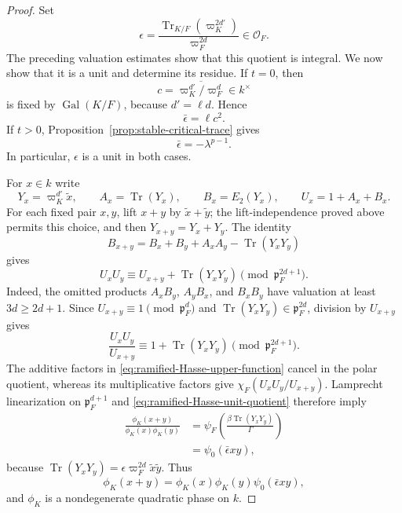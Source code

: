 \documentclass[11pt]{amsart}
\theoremstyle{definition}
\theoremstyle{remark}
\newcommand{\cO}{\mathcal O}
\newcommand{\p}{\mathfrak p}
\newcommand{\Tr}{\operatorname{Tr}}
\newcommand{\Gal}{\operatorname{Gal}}
\begin{document}
\begin{proof}
Set
\begin{equation}\label{eq:ramified-Hasse-epsilon}
 \epsilon=
 \frac{\Tr_{K/F}(\varpi_K^{2d'})}{\varpi_F^{2d}}\in\cO_F.
\end{equation}
The preceding valuation estimates show that this quotient is integral.
We now show that it is a unit and determine its residue.  If $t=0$,
then
\[
 c=\overline{\varpi_K^{d'}/\varpi_F^d}\in k^\times
\]
is fixed by $\Gal(K/F)$, because $d'=\ell d$.  Hence
\begin{equation}\label{eq:ramified-epsilon-tame}
 \bar\epsilon=\ell c^2.
\end{equation}
If $t>0$, Proposition~\ref{prop:stable-critical-trace} gives
\begin{equation}\label{eq:ramified-epsilon-wild}
 \bar\epsilon=-\lambda^{p-1}.
\end{equation}
In particular, $\epsilon$ is a unit in both cases.

For $x\in k$ write
\[
 Y_x=\varpi_K^{d'}\widetilde x,\qquad
 A_x=\Tr(Y_x),\qquad B_x=E_2(Y_x),\qquad
 U_x=1+A_x+B_x.
\]
For each fixed pair $x,y$, lift $x+y$ by
$\widetilde x+\widetilde y$; the lift-independence proved above permits
this choice, and then $Y_{x+y}=Y_x+Y_y$.  The identity
\[
 B_{x+y}=B_x+B_y+A_xA_y-\Tr(Y_xY_y)
\]
gives
\[
 U_xU_y
 \equiv U_{x+y}+\Tr(Y_xY_y)
 \pmod{\p_F^{2d+1}}.
\]
Indeed, the omitted products $A_xB_y$, $A_yB_x$, and $B_xB_y$ have
valuation at least $3d\ge2d+1$.  Since
$U_{x+y}\equiv1\pmod{\p_F^d}$ and
$\Tr(Y_xY_y)\in\p_F^{2d}$, division by $U_{x+y}$ gives
\begin{equation}\label{eq:ramified-Hasse-unit-quotient}
 \frac{U_xU_y}{U_{x+y}}
 \equiv1+\Tr(Y_xY_y)\pmod{\p_F^{2d+1}}.
\end{equation}
The additive factors in
\eqref{eq:ramified-Hasse-upper-function} cancel in the polar quotient,
whereas its multiplicative factors give
$\chi_F(U_xU_y/U_{x+y})$.  Lamprecht linearization on
$\p_F^{d+1}$ and \eqref{eq:ramified-Hasse-unit-quotient} therefore
imply
\begin{align*}
 \frac{\phi_K(x+y)}{\phi_K(x)\phi_K(y)}
 &=\psi_F\!\left(
    \frac{\beta\Tr(Y_xY_y)}{\Gamma}\right)\\
 &=\psi_0(\bar\epsilon xy),
\end{align*}
because
$\Tr(Y_xY_y)=\epsilon\varpi_F^{2d}\widetilde x\widetilde y$.
Thus
\begin{equation}\label{eq:ramified-Hasse-polar}
 \phi_K(x+y)=\phi_K(x)\phi_K(y)\psi_0(\bar\epsilon xy),
\end{equation}
and $\phi_K$ is a nondegenerate quadratic phase on $k$.


\end{proof}
\end{document}
